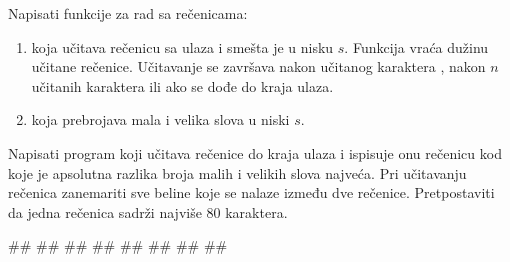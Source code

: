 \begin{Exercise}[difficulty=1, label=NIS_20] 
Napisati funkcije za rad sa rečenicama:
\begin{enumerate}
\setlength\itemsep{0em}
\item {} koja učitava rečenicu sa ulaza i smešta je u nisku $s$. 
Funkcija vraća dužinu učitane rečenice. Učitavanje se završava nakon učitanog karaktera , nakon $n$ učitanih karaktera ili ako
se dođe do kraja ulaza.
\item {} koja prebrojava mala i velika slova u niski $s$.
\end{enumerate}
 Napisati program koji učitava rečenice do kraja ulaza i ispisuje onu rečenicu kod koje je apsolutna razlika broja malih i velikih slova najveća.
 Pri učitavanju rečenica zanemariti sve beline koje se nalaze između dve rečenice. 
Pretpostaviti da jedna rečenica sadrži najviše 80 karaktera.

\begin{maxitest}
\begin{upotreba}{1}
#\naslovInt#
##
##
##
##
##
##
##
\end{upotreba}
\end{maxitest}

\end{Exercise}
\ifresenja
\begin{Answer}[ref=NIS_20]
\end{Answer}
\fi


